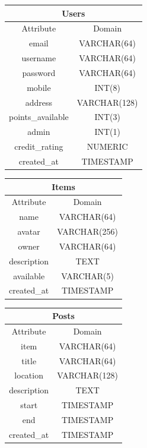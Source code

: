 \begin{center}
\begin{tabular}{|c|c|}
\multicolumn{2}{c}{Users}\\[2mm]
\hline
Attribute & Domain\\
\hline
email & VARCHAR(64)\\
username & VARCHAR(64) \\
password & VARCHAR(64) \\
mobile & INT(8) \\
address & VARCHAR(128) \\
points\_available & INT(3) \\
admin & INT(1) \\
credit\_rating & NUMERIC \\
created\_at & TIMESTAMP \\
\hline
\end{tabular}
\end{center}



\begin{center}
\begin{tabular}{|c|c|}
\multicolumn{2}{c}{Items}\\[2mm]
\hline
Attribute & Domain\\
\hline
name & VARCHAR(64)\\
avatar & VARCHAR(256) \\
owner & VARCHAR(64) \\
description & TEXT \\
available & VARCHAR(5)\\
created\_at & TIMESTAMP \\
\hline
\end{tabular}
\end{center}

\begin{center}
\begin{tabular}{|c|c|}
\multicolumn{2}{c}{Posts}\\[2mm]
\hline
Attribute & Domain\\
\hline
item & VARCHAR(64)\\
title & VARCHAR(64) \\
location & VARCHAR(128) \\
description & TEXT \\
start & TIMESTAMP \\
end & TIMESTAMP \\
created\_at & TIMESTAMP \\
\hline
\end{tabular}
\end{center}

